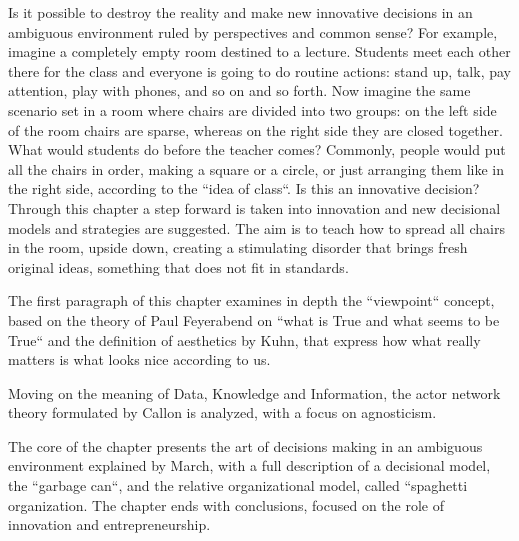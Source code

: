 Is it possible to destroy the reality and make new innovative decisions in an ambiguous environment ruled by perspectives and common sense? For example, imagine a completely empty room destined to a lecture. Students meet each other there for the class and everyone is going to do routine actions: stand up, talk, pay attention, play with phones, and so on and so forth. Now imagine the same scenario set in a room where chairs are divided into two groups: on the left side of the room chairs are sparse, whereas on the right side they are closed together. What would students do before the teacher comes? Commonly, people would put all the chairs in order, making a square or a circle, or just arranging them like in the right side, according to the ``idea of class``. Is this an innovative decision? Through this chapter a step forward is taken into innovation and new decisional models and strategies are suggested. The aim is to teach how to spread all chairs in the room, upside down, creating a stimulating disorder that brings fresh original ideas, something that does not fit in standards.

The first paragraph of this chapter examines in depth the ``viewpoint`` concept, based on the theory of Paul Feyerabend on ``what is True and what seems to be True`` and the definition of aesthetics by Kuhn, that express how what really matters is what looks nice according to us.

Moving on the meaning of Data, Knowledge and Information, the actor network theory formulated by Callon is analyzed, with a focus on agnosticism.

The core of the chapter presents the art of decisions making in an ambiguous environment explained by March, with a full description of a decisional model, the ``garbage can``, and the relative organizational model, called ``spaghetti organization. The chapter ends with conclusions, focused on the role of innovation and entrepreneurship.
